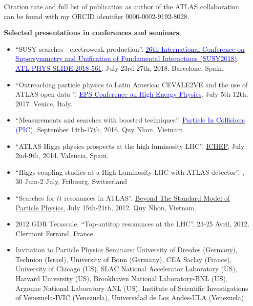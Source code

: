 \documentclass[letterpaper,10pt]{article}
\newcommand{\resheading}[1]{{\large \colorbox{mygrey}{\begin{minipage}{\textwidth}{\textbf{#1 \vphantom{p\^{E}}}}\end{minipage}}}}
\begin{document}
	Citation rate and full list of publication as author of the ATLAS collaboration can be found with my ORCID identifier 0000-0002-9192-8028.
	

\noindent
\resheading{Selected presentations in conferences and seminars}

	\begin{itemize}
	        \item ``SUSY searches - electroweak production''. \href{https://susy2018.ifae.es}{\textcolor{blue}{26th International Conference on Supersymmetry and Unification of Fundamental Interactions (SUSY2018)}}. \href{http://cds.cern.ch/record/2632810/files/ATL-PHYS-SLIDE-2018-561.pdf}{\textcolor{blue}{ATL-PHYS-SLIDE-2018-561}}. July 23rd-27th, 2018. Barcelone, Spain.
	      	\item ``Outreaching particle physics to Latin America: CEVALE2VE and the use of ATLAS open data ''. \href{http://inspirehep.net/record/1664808}{\textcolor{blue}{EPS Conference on High Energy Physics}}. July 5th-12th, 2017. Venice, Italy.
		\item ``Measurements and searches with boosted techniques''. \href{https://indico.cern.ch/event/456448/contributions/2274584/attachments/1376918/2091182/PIC2016_Camacho_v2.pdf}{\textcolor{blue}{Particle In Collisions (PIC)}}. September 14th-17th, 2016. Quy Nhon, Vietnam.
		\item ``ATLAS Higgs physics prospects at the high luminosity LHC''. 
     \href{http://indico.ific.uv.es/indico/conferenceDisplay.py?ovw=True&confId=2025}{ ICHEP}, 
     July 2nd-9th, 2014. Valencia, Spain. \href{https://cds.cern.ch/record/1742973}{\color{blue}{ATL-PHYS-SLIDE-2014-424}}
     		\item ``Higgs coupling studies at a High Luminosity-LHC with ATLAS detector''. 
    \href{http://www.sps.ch/en/events/sps_annual_meeting_2014/}{\color{blue}{Swiss Physics Society (SPS) Meeting 2014}}, 30 Juin-2 July, Fribourg, Switzerland
     		\item ``Searches for $t\bar{t}$ resonances in ATLAS''. 
     \href{http://confs.obspm.fr/RencontresVietnam/BTSM/index.htm}{Beyond The Standard Model of Particle Physics}, 
     July 15th-21th, 2012. Quy Nhon, Vietnam. \href{https://cds.cern.ch/record/1471377}{\color{blue}{ATL-PHYS-SLIDE-2012-487}}
     		\item 2012 GDR Terascale. ``Top-antitop resonances at the LHC''. 23-25 Avril, 2012. Clermont
Ferrand, France.
     		\item Invitation to Particle Physics Seminars: University of Dresdes (Germany), Technion (Israel), University of Bonn (Germany), CEA Saclay (France), University of Chicago (US),  SLAC National Accelerator Laboratory (US), Harvard University (US), Brookhaven National Laboratory-BNL (US), Argonne National Laboratory-ANL (US), Institute of Scientific Investigations of Venezuela-IVIC (Venezuela), Universidad de Los Andes-ULA (Venezuela)
	\end{itemize} %
\end{document}
